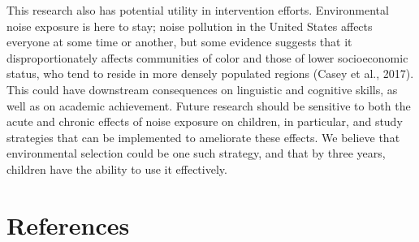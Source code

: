 \documentclass[10pt, letterpaper]{article}
\begin{document}
This research also has potential utility in intervention efforts.
Environmental noise exposure is here to stay; noise pollution in the
United States affects everyone at some time or another, but some
evidence suggests that it disproportionately affects communities of
color and those of lower socioeconomic status, who tend to reside in
more densely populated regions (Casey et al., 2017). This could have
downstream consequences on linguistic and cognitive skills, as well as
on academic achievement. Future research should be sensitive to both the
acute and chronic effects of noise exposure on children, in particular,
and study strategies that can be implemented to ameliorate these
effects. We believe that environmental selection could be one such
strategy, and that by three years, children have the ability to use it
effectively.

\hypertarget{references}{%
\section{References}\label{references}}

\setlength{\parindent}{-0.1in} 
\setlength{\leftskip}{0.125in}

\noindent
\end{document}
